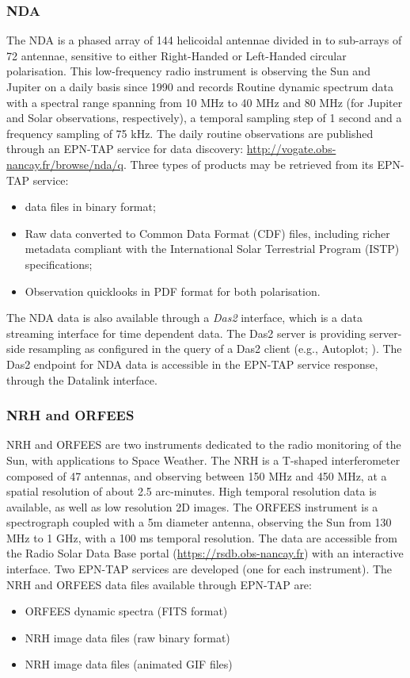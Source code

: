 \documentclass[11pt,a4paper]{ivoa}
\begin{document}
\subsubsection{NDA}
The NDA is a phased array of 144 helicoidal antennae divided in to sub-arrays of 72 antennae, sensitive 
to either Right-Handed or Left-Handed circular polarisation. This low-frequency radio instrument is
observing the Sun and Jupiter on a daily basis since 1990 and records Routine dynamic spectrum data with 
a spectral range spanning from 10 MHz to 40 MHz and 80 MHz (for Jupiter and Solar observations, 
respectively), a temporal sampling step of 1 second and a frequency sampling of 75 kHz. The daily 
routine observations are published through an EPN-TAP service for data discovery: 
\url{http://vogate.obs-nancay.fr/browse/nda/q}. Three types of products may be retrieved from its 
EPN-TAP service:
\begin{itemize}
\item data files in binary format;
\item Raw data converted to Common Data Format (CDF) files, including richer metadata compliant with the 
International Solar Terrestrial Program (ISTP) specifications;
\item Observation quicklooks in PDF format for both polarisation.
\end{itemize}

The NDA data is also available through a \emph{Das2} \citep{10.1002/essoar.10500359.1} interface, which 
is a data streaming interface for time dependent data. The Das2 server is providing server-side 
resampling as configured in the query of a Das2 client (e.g., Autoplot; \cite{10.1007/s12145-010-0049-0}). 
The Das2 endpoint for NDA data is accessible in the EPN-TAP service response, through the Datalink interface.
 
\subsubsection{NRH and ORFEES}
NRH and ORFEES are two instruments dedicated to the radio monitoring of the Sun, with applications to 
Space Weather. The NRH is a T-shaped interferometer composed of 47 antennas, and observing between 150 
MHz and 450 MHz, at a spatial resolution of about 2.5 arc-minutes. High temporal resolution data is 
available, as well as low resolution 2D images. The ORFEES instrument is a spectrograph coupled with a 
5m diameter antenna, observing the Sun from 130 MHz to 1 GHz, with a 100 ms temporal resolution. The 
data are accessible from the Radio Solar Data Base portal (\url{https://rsdb.obs-nancay.fr}) with an 
interactive interface. Two EPN-TAP services are developed (one for each instrument). The NRH and ORFEES data files available through EPN-TAP are:
\begin{itemize}
\item ORFEES dynamic spectra (FITS format)
\item NRH image data files (raw binary format)
\item NRH image data files (animated GIF files)
\end{itemize}
\end{document}
